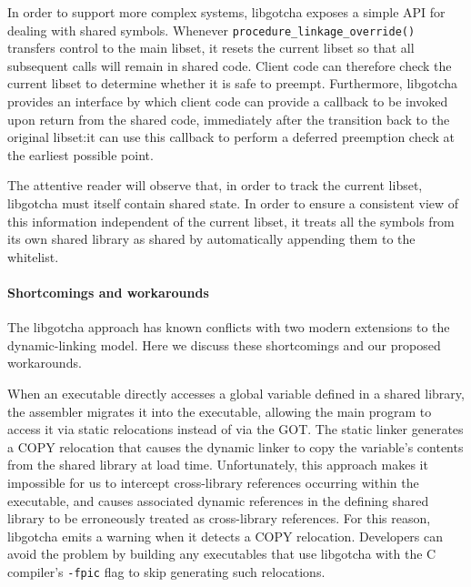 In order to support more complex systems, libgotcha exposes a simple API for dealing
with shared symbols.  Whenever \texttt{procedure\_linkage\_override()} transfers
control to the main libset, it resets the current libset so that all subsequent calls
will remain in shared code.  Client code can therefore check the current libset to
determine
whether it is safe to preempt.  Furthermore, libgotcha provides an interface by which
client code can provide a callback to be invoked upon return from the shared code,
immediately after the transition back to the original libset:\@ it can use this
callback to perform a deferred preemption check at the earliest possible point.

The attentive reader will observe that, in order to track the current libset,
libgotcha must itself contain shared state.  In order to ensure a consistent view of
this information independent of the current libset, it treats all the symbols from
its own shared library as shared by automatically appending them to the whitelist.

\paragraph{Shortcomings and workarounds}

The libgotcha approach has known conflicts with two modern extensions to the
dynamic-linking model.  Here we discuss these shortcomings and our proposed
workarounds.

When an executable directly accesses a global variable defined in a shared library,
the assembler migrates it into the executable, allowing the main program to access it
via static relocations instead of via the GOT.  The static linker generates a COPY
relocation that causes the dynamic linker to copy the variable's contents from the
shared library at load time.  Unfortunately, this approach makes
it impossible for us to intercept cross-library references occurring within the
executable, and causes associated dynamic references in the defining shared library
to be erroneously treated as cross-library references.  For this reason, libgotcha
emits a warning when it detects a COPY relocation.  Developers can avoid the problem
by building any executables that use libgotcha with the C compiler's \texttt{-fpic}
flag to skip generating such relocations.

